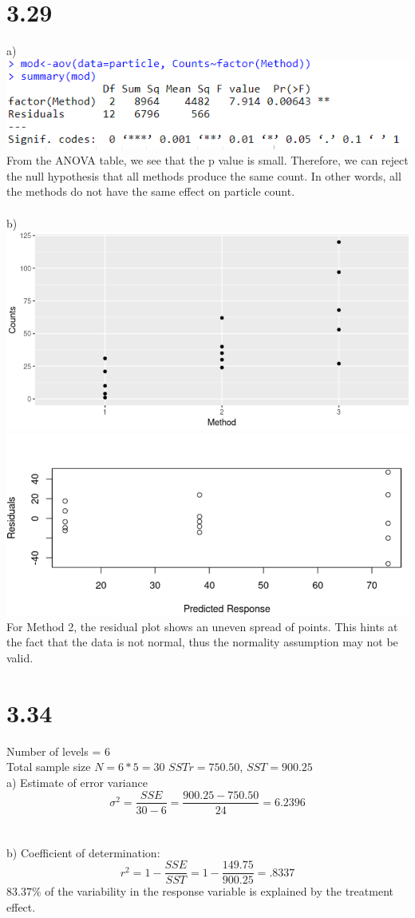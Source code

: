 \documentclass{article}
\begin{document}
\section*{3.29}
a)
\\\includegraphics{13.29a.PNG}
\\From the ANOVA table, we see that the p value is small. Therefore, we can reject the null hypothesis that all methods produce the same count. In other words, all the methods do not have the same effect on particle count.
\\
\\b) 
\\\includegraphics{3.29bsp.PNG}
\\\includegraphics{3.29brp.PNG}
\\For Method 2, the residual plot shows an uneven spread of points. This hints at the fact that the data is not normal, thus the normality assumption may not be valid.
\\
\section*{3.34}
Number of levels = 6
\\Total sample size $N = 6 * 5 = 30$
$SSTr = 750.50$, $SST = 900.25$
\\a) Estimate of error variance $$\sigma^2 = \frac{SSE}{30-6} = \frac{900.25-750.50}{24} = 6.2396$$
\\
\\b) Coefficient of determination: $$r^2 = 1 - \frac{SSE}{SST} = 1 - \frac{149.75}{900.25} = .8337$$
$83.37\%$ of the variability in the response variable is explained by the treatment effect.
\\
\end{document}
